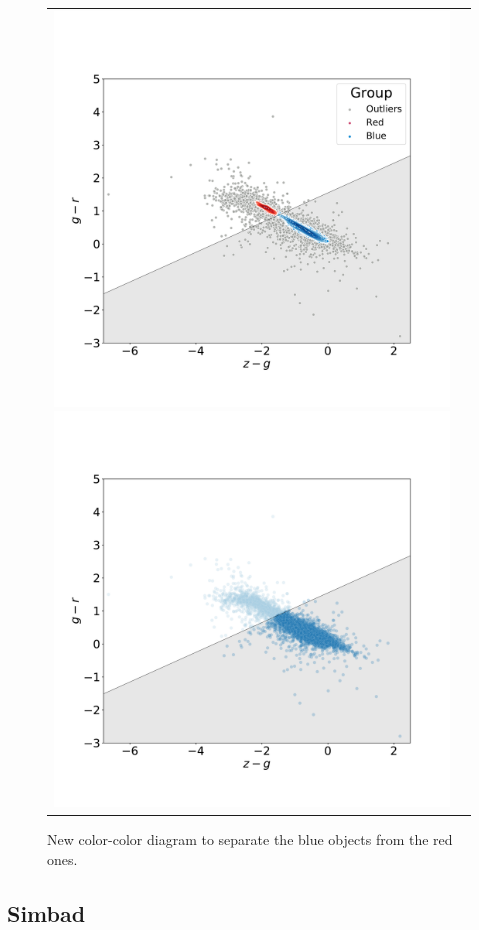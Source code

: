 \documentclass[fleqn,usenatbib]{mnras}
\begin{document}
\begin{figure}
\centering
\begin{tabular}{l l}
  \includegraphics[width=0.5\linewidth, trim=10 10 5 8, clip]{Figs/blued-red-hdbscan.pdf}
   \includegraphics[width=0.5\linewidth, trim=10 10 5 8. clip]{Figs/blued-red-hdbscan-soft.pdf}
  \end{tabular}  
  \caption{New color-color diagram to separate the blue objects from the red ones.}
\label{fig:hdbscan}
\end{figure}


\clearpage
\subsection{Simbad}
\label{sec:simbad}

\end{document}
